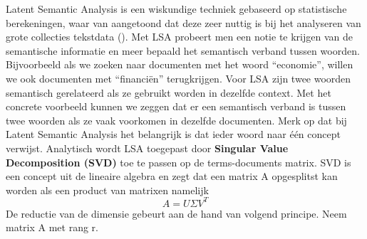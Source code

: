 Latent Semantic Analysis is een wiskundige techniek gebaseerd op statistische berekeningen, waar van aangetoond dat deze zeer nuttig is bij het analyseren van grote collecties tekstdata (\cite{furnas1988information}). Met LSA probeert men een notie te krijgen van de semantische informatie en meer bepaald het semantisch verband tussen woorden. Bijvoorbeeld als we zoeken naar documenten met het woord ``economie'', willen we ook documenten met ``financi\"en'' terugkrijgen. Voor LSA zijn twee woorden semantisch gerelateerd als ze gebruikt worden in dezelfde context. Met het concrete voorbeeld kunnen we zeggen dat er een semantisch verband is tussen twee woorden als ze vaak voorkomen in dezelfde documenten.
\newline
Merk op dat bij Latent Semantic Analysis het belangrijk is dat ieder woord naar \'e\'en concept verwijst.
%
\newline
Analytisch wordt LSA toegepast door \textbf{Singular Value Decomposition (SVD)} toe te passen op de terms-documents matrix. SVD is een concept uit de lineaire algebra en zegt dat een matrix A opgesplitst kan worden als een product van matrixen namelijk \\
\[A = U\Sigma V^T \]
De reductie van de dimensie gebeurt aan de hand van volgend principe. Neem matrix A met rang r.
%
\newcommand{\vect}{\mathbf}
\newcommand{\nul}{\operatorname{Nul}}
\newcommand{\col}{\operatorname{Kolommen }}
\newcommand{\row}{\operatorname{Rijen}}
